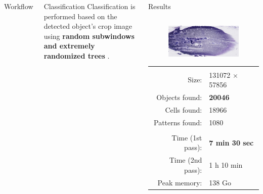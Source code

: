 \documentclass{beamer}
\begin{document}
\begin{frame}
\begin{columns}[t]
\begin{exampleblock}{Workflow}
\end{exampleblock}

\begin{exampleblock}{Classification}
Classification is performed based on the detected object's crop image using \textbf{random subwindows and extremely randomized trees} \cite{Maree201617}.
\end{exampleblock}

\begin{exampleblock}{Results}

	\begin{columns}
		\begin{column}{0.48\linewidth}
			\begin{figure}
				\center
				\includegraphics[scale=0.6]{images/728725.png}
			\end{figure}
			
			\begin{tabular}{rl}			
				& \\			
				Size: & 131072 $\times$ 57856\\	
				Objects found: & \textbf{20046} \\
				Cells found: & 18966 \\
				Patterns found: & 1080 \\
				& \\
				Time (1st pass): & \textbf{7 min 30 sec} \\
				Time (2nd pass): & 1 h 10 min  \\
				Peak memory: & 138 Go \\
			\end{tabular}
		\end{column}


\end{columns}
\end{exampleblock}
\end{columns}
\end{frame}
\end{document}
